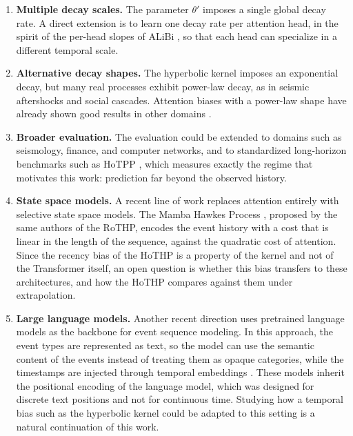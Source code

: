 \begin{enumerate}
    \item \textbf{Multiple decay scales.} The parameter $\theta'$ imposes a single global decay rate. A direct extension is to learn one decay rate per attention head, in the spirit of the per-head slopes of ALiBi \cite{press_train_2021}, so that each head can specialize in a different temporal scale.

    \item \textbf{Alternative decay shapes.} The hyperbolic kernel imposes an exponential decay, but many real processes exhibit power-law decay, as in seismic aftershocks and social cascades. Attention biases with a power-law shape have already shown good results in other domains \cite{shen_power_2025}. 

    \item \textbf{Broader evaluation.} The evaluation could be extended to domains such as seismology, finance, and computer networks, and to standardized long-horizon benchmarks such as HoTPP \cite{karpukhin_hotpp_2024}, which measures exactly the regime that motivates this work: prediction far beyond the observed history.

    \item \textbf{State space models.} A recent line of work replaces attention entirely with selective state space models. The Mamba Hawkes Process \cite{gao_mamba_2024}, proposed by the same authors of the RoTHP, encodes the event history with a cost that is linear in the length of the sequence, against the quadratic cost of attention. Since the recency bias of the HoTHP is a property of the kernel and not of the Transformer itself, an open question is whether this bias transfers to these architectures, and how the HoTHP compares against them under extrapolation.

    \item \textbf{Large language models.} Another recent direction uses pretrained language models as the backbone for event sequence modeling. In this approach, the event types are represented as text, so the model can use the semantic content of the events instead of treating them as opaque categories, while the timestamps are injected through temporal embeddings \cite{liu_tpp-llm_2025}. These models inherit the positional encoding of the language model, which was designed for discrete text positions and not for continuous time. Studying how a temporal bias such as the hyperbolic kernel could be adapted to this setting is a natural continuation of this work.
\end{enumerate}
